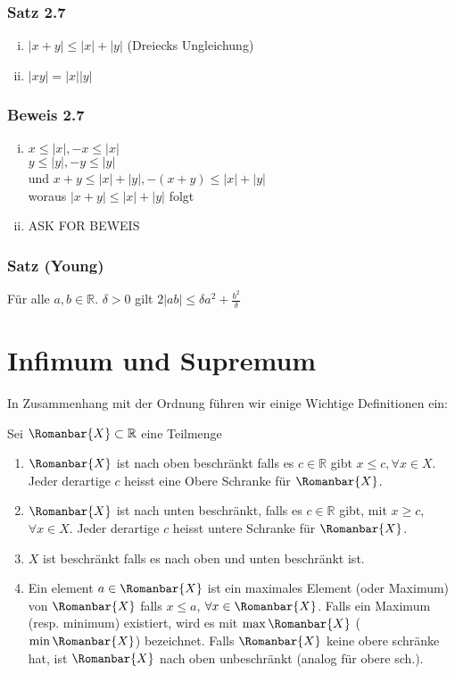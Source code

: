 \begin{enumerate}
\subsubsection*{Satz 2.7}
\begin{enumerate}[i)]
\item $\left| {x + y} \right| \le \left| x \right| + \left| y \right|$ (Dreiecks Ungleichung)
\item $\left| {xy} \right| = \left| x \right|\left| y \right|$
\end{enumerate}
\subsubsection*{Beweis 2.7}
\begin{enumerate}[i)]
\item $x \le \left| x \right|, - x \le \left| x \right|$\\$y \le \left| y \right|, - y \le \left| y \right|$\\und $x+y\leq  \left| x \right| +  \left| y \right|, - (x + y) \le \left| x \right| + \left| y \right|$ \\ woraus $\left| {x + y} \right| \le \left| x \right| + \left| y \right|$ folgt
\item ASK FOR BEWEIS
\end{enumerate}

\subsubsection*{Satz (Young)}
Für alle $a,b\in\mathbb{R}$. $\delta >0$ gilt $2\left| {ab} \right| \le \delta {a^2} + \frac{{{b^2}}}{\delta }$
\end{enumerate}

\section{Infimum und Supremum}
In Zusammenhang mit der Ordnung führen wir einige Wichtige Definitionen ein:

\begin{definition}{2.8}
Sei $\Romanbar{X}\subset\mathbb{R}$ eine Teilmenge 
\begin{enumerate}[\indent a)]
\item $\Romanbar{X}$ ist nach oben beschränkt falls es $c\in\mathbb{R}$ gibt $x\leq c, \forall x\in X$. Jeder derartige $c$ heisst eine Obere Schranke für $\Romanbar{X}$.
\item $\Romanbar{X}$ ist nach unten beschränkt, falls es $c\in\mathbb{R}$ gibt, mit $x\geq c$, $\forall x\in X$. Jeder derartige $c$ heisst untere Schranke für $\Romanbar{X}$.
\item $X$ ist beschränkt falls es nach oben und unten beschränkt ist.
\item Ein element $a\in\Romanbar{X}$ ist ein maximales Element (oder Maximum) von $\Romanbar{X}$ falls $x\leq a$, $\forall x\in\Romanbar{X}$. Falls ein Maximum (resp. minimum) existiert, wird es mit $\max\Romanbar{X}$ ($\min\Romanbar{X}$) bezeichnet. Falls $\Romanbar{X}$ keine obere schränke hat, ist $\Romanbar{X}$ nach oben unbeschränkt (analog für obere sch.).
\end{enumerate}
\end{definition}
